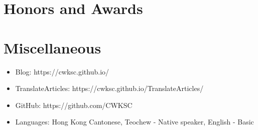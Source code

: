 \documentclass{resume}
\begin{document}
\section{Honors and Awards}

\section{Miscellaneous}
\begin{itemize}[parsep=0.5ex]
  \item Blog: https://cwksc.github.io/
  \item TranslateArticles: https://cwksc.github.io/TranslateArticles/
  \item GitHub: https://github.com/CWKSC
  \item Languages: Hong Kong Cantonese, Teochew - Native speaker, English - Basic
\end{itemize}

%
%
\end{document}

